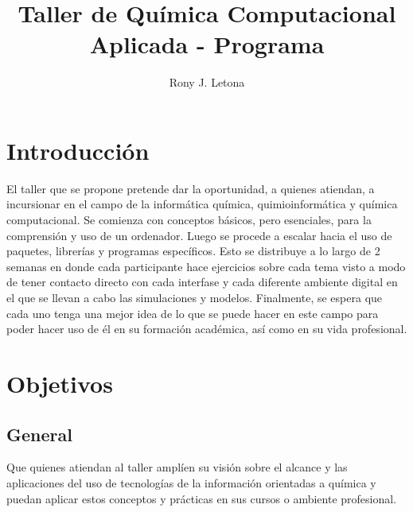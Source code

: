 \documentclass[10pt,letterpaper]{article}
\author{Rony J. Letona}
\title{Taller de Qu\'imica Computacional Aplicada - Programa}
\begin{document}
\maketitle

\section{Introducci\'on}
El taller que se propone pretende dar la oportunidad, a quienes atiendan, a incursionar en el campo de la inform\'atica qu\'imica, quimioinform\'atica y qu\'imica computacional. Se comienza con conceptos b\'asicos, pero esenciales, para la comprensi\'on y uso de un ordenador. Luego se procede a escalar hacia el uso de paquetes, librer\'ias y programas espec\'ificos. Esto se distribuye a lo largo de 2 semanas en donde cada participante hace ejercicios sobre cada tema visto a modo de tener contacto directo con cada interfase y cada diferente ambiente digital en el que se llevan a cabo las simulaciones y modelos. Finalmente, se espera que cada uno tenga una mejor idea de lo que se puede hacer en este campo para poder hacer uso de \'el en su formaci\'on acad\'emica, as\'i como en su vida profesional.

\section{Objetivos}
\subsection{General}
Que quienes atiendan al taller ampl\'ien su visi\'on sobre el alcance y las aplicaciones del uso de tecnolog\'ias de la informaci\'on orientadas a qu\'imica y puedan aplicar estos conceptos y pr\'acticas en sus cursos o ambiente profesional.
\end{document}
